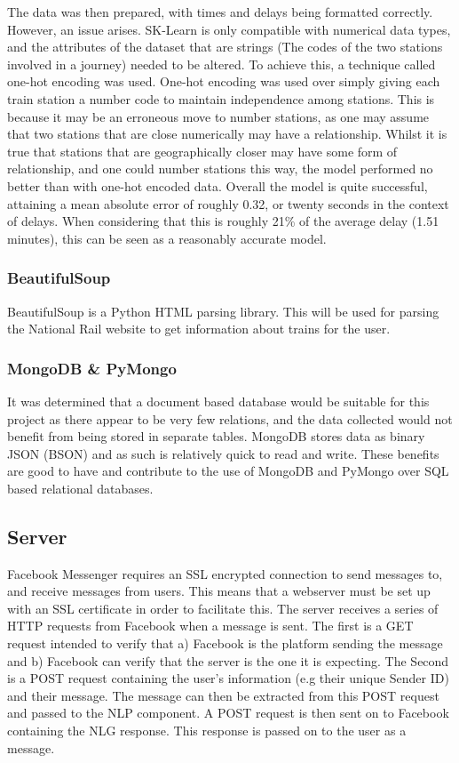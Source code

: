 \documentclass[12pt,a4paper]{article}
\begin{document}
    The data was then prepared, with times and delays being formatted correctly. However, an issue arises. SK-Learn is only compatible with numerical data types, and the attributes of the dataset that are strings (The codes of the two stations involved in a journey) needed to be altered. To achieve this, a technique called one-hot encoding was used. One-hot encoding was used over simply giving each train station a number code to maintain independence among stations. This is because it may be an erroneous move to number stations, as one may assume that two stations that are close numerically may have a relationship. Whilst it is true that stations that are geographically closer may have some form of relationship, and one could number stations this way, the model performed no better than with one-hot encoded data. Overall the model is quite successful, attaining a mean absolute error of roughly 0.32, or twenty seconds in the context of delays. When considering that this is roughly 21\% of the average delay (1.51 minutes), this can be seen as a reasonably accurate model.  
    
    \subsubsection*{BeautifulSoup}
    \label{subsubsection:BeautifulSoup}
    BeautifulSoup is a Python HTML parsing library. This will be used for parsing the National Rail website to get information about trains for the user.
    
    \subsubsection*{MongoDB \& PyMongo}
    \label{subsubsection:mongodb}
    It was determined that a document based database would be suitable for this project as there appear to be very few relations, and the data collected would not benefit from being stored in separate tables. MongoDB stores data as binary JSON (BSON) \citep{korneliusz_2014} and as such is relatively quick to read and write. These benefits are good to have and contribute to the use of MongoDB and PyMongo over SQL based relational databases.
    
    \subsection{Server}
    \label{subsection:Server}
    Facebook Messenger requires an SSL encrypted connection to send messages to, and receive messages from users. This means that a webserver must be set up with an SSL certificate in order to facilitate this. The server receives a series of HTTP requests from Facebook when a message is sent. The first is a GET request intended to verify that a) Facebook is the platform sending the message and b) Facebook can verify that the server is the one it is expecting. The Second is a POST request containing the user's information (e.g their unique Sender ID) and their message. The message can then be extracted from this POST request and passed to the NLP component. A POST request is then sent on to Facebook containing the NLG response. This response is passed on to the user as a message.
    
\end{document}
